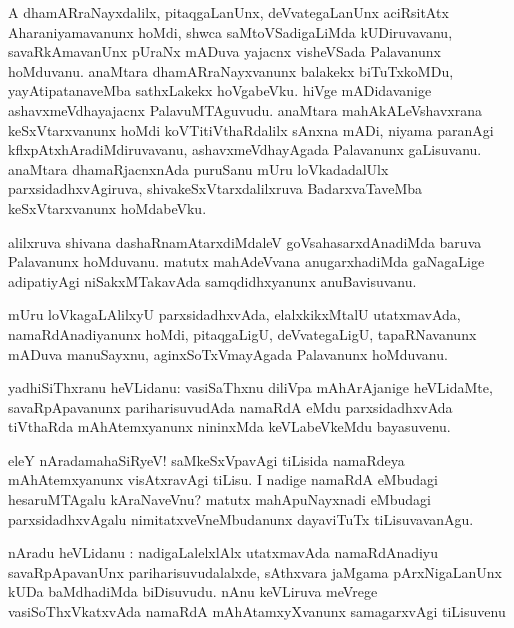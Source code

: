 \documentclass{article}
\begin{document}
\begin{mn}
A dhamARraNayxdalilx, pitaqgaLanUnx, deVvategaLanUnx aciRsitAtx Aharaniyamavanunx hoMdi, shwca 
saMtoVSadigaLiMda kUDiruvavanu, savaRkAmavanUnx pUraNx mADuva yajacnx visheVSada Palavanunx 
hoMduvanu. anaMtara dhamARraNayxvanunx balakekx biTuTxkoMDu, yayAtipatanaveMba sathxLakekx 
hoVgabeVku. hiVge mADidavanige ashavxmeVdhayajacnx PalavuMTAguvudu. anaMtara mahAkALeVshavxrana
keSxVtarxvanunx hoMdi koVTitiVthaRdalilx sAnxna mADi, niyama paranAgi kflxpAtxhAradiMdiruvavanu, 
ashavxmeVdhayAgada Palavanunx gaLisuvanu. anaMtara dhamaRjacnxnAda puruSanu mUru loVkadadalUlx 
parxsidadhxvAgiruva, shivakeSxVtarxdalilxruva BadarxvaTaveMba keSxVtarxvanunx hoMdabeVku.
\end{mn}

\begin{mn}
alilxruva shivana dashaRnamAtarxdiMdaleV goVsahasarxdAnadiMda baruva Palavanunx hoMduvanu.
matutx mahAdeVvana anugarxhadiMda gaNagaLige adipatiyAgi niSakxMTakavAda samqdidhxyanunx 
anuBavisuvanu. 
\end{mn}

\begin{mn}
mUru loVkagaLAlilxyU parxsidadhxvAda, elalxkikxMtalU utatxmavAda, namaRdAnadiyanunx hoMdi, 
pitaqgaLigU, deVvategaLigU, tapaRNavanunx mADuva manuSayxnu, aginxSoTxVmayAgada Palavanunx 
hoMduvanu.
\end{mn}


\begin{mn}
yadhiSiThxranu heVLidanu: vasiSaThxnu diliVpa mAhArAjanige heVLidaMte, savaRpApavanunx 
pariharisuvudAda namaRdA eMdu parxsidadhxvAda tiVthaRda mAhAtemxyanunx nininxMda keVLabeVkeMdu 
bayasuvenu.
\end{mn}

\begin{mn}
eleY nAradamahaSiRyeV! saMkeSxVpavAgi tiLisida namaRdeya mAhAtemxyanunx visAtxravAgi tiLisu. I 
nadige namaRdA  eMbudagi hesaruMTAgalu kAraNaveVnu? matutx mahApuNayxnadi eMbudagi 
parxsidadhxvAgalu nimitatxveVneMbudanunx dayaviTuTx tiLisuvavanAgu.
\end{mn}

\begin{mn}
nAradu heVLidanu : nadigaLalelxlAlx utatxmavAda namaRdAnadiyu savaRpApavanUnx pariharisuvudalalxde,
sAthxvara jaMgama pArxNigaLanUnx kUDa baMdhadiMda biDisuvudu. nAnu keVLiruva meVrege 
vasiSoThxVkatxvAda namaRdA mAhAtamxyXvanunx samagarxvAgi tiLisuvenu
\end{mn}
\end{document}
